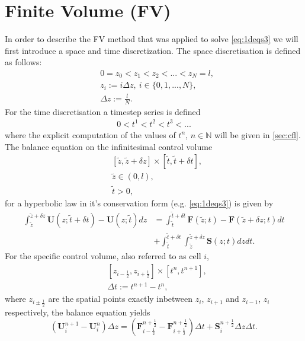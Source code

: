 \documentclass[a4paper, oneside]{discothesis}
\begin{document}
\section{Finite Volume (FV)} \label{sec:fv}
In order to describe the FV method that was applied to solve \autoref{eq:1deqs3} we will first introduce a space and time discretization.
The space discretisation is defined as follows:
\begin{align}
	&0 = z_0 < z_1 < z_2 < ... < z_N = l, \\
	&z_i :=  i \Delta z,\ i \in \{0,1,...,N\} , \\
	&\Delta z := \frac{l}{N}.
\end{align}
For the time discretisation a timestep series is defined
\begin{align}
	0 < t^1 < t^2 < t^3 < ...
\end{align}
where the explicit computation of the values of $t^n$, $n \in \mathbb{N}$  will be given in \autoref{sec:cfl}.
The balance equation on the infinitesimal control volume 
\begin{align}
	&[\tilde{z}, \tilde{z} + \delta z] \times [\tilde{t}, \tilde{t} + \delta t], \\
	&\tilde{z} \in (0,l), \\
	&\tilde{t} > 0,
\end{align}
for a hyperbolic law in it's conservation form (e.g. \autoref{eq:1deqs3}) is given by
\begin{align}
	\int_{\tilde{z}}^{\tilde{z} + \delta z} \mathbf{U} (z; \tilde{t} + \delta t) - \mathbf{U} (z;\tilde{t}) dz &= \int_{\tilde{t}}^{\tilde{t}+\delta t} \mathbf{F}(\tilde{z};t) - \mathbf{F}(\tilde{z} + \delta z; t) dt\\
																											   &+ \int_{\tilde{t}}^{\tilde{t} + \delta t} \int_{\tilde{z}}^{\tilde{z} + \delta z}  \mathbf{S}(z;t) dzdt.
\end{align}
For the specific control volume, also referred to as cell $i$,
\begin{align}
	&[z_{i-\frac{1}{2}},z_{i+\frac{1}{2}}] \times [t^n, t^{n+1}], \\
	&\Delta t := t^{n+1}-t^n,
\end{align}
where $z_{i \pm \frac{1}{2}}$ are the spatial points exactly inbetween $z_{i}$, $z_{i+1}$ and $z_{i-1}$, $z_{i}$ respectively, the balance equation yields
\begin{equation}
	(\mathbf{U} _i^{n+1}-\mathbf{U} _i^n) \Delta z = (\mathbf{F}_{i-\frac{1}{2}}^{n+\frac{1}{2}} - \mathbf{F}_{i+\frac{1}{2}}^{n+\frac{1}{2}}) \Delta t + \mathbf{S}_i^{n+\frac{1}{2}} \Delta z \Delta t.
\end{equation}
\end{document}
